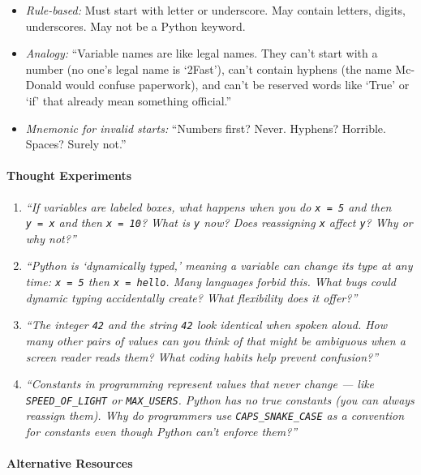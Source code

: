 \documentclass[
  justified,
  openright,
]{tufte-book}
\let\paragraph\paragraph
\let\paragraph\paragraph
\providecommand{\tightlist}{%
  \setlength{\itemsep}{0pt}\setlength{\parskip}{0pt}}
\begin{document}
\begin{itemize}
\tightlist
\item
  \emph{Rule-based:} Must start with letter or underscore. May contain
  letters, digits, underscores. May not be a Python keyword.
\item
  \emph{Analogy:} ``Variable names are like legal names. They can't
  start with a number (no one's legal name is `2Fast'), can't contain
  hyphens (the name Mc-Donald would confuse paperwork), and can't be
  reserved words like `True' or `if' that already mean something
  official.''
\item
  \emph{Mnemonic for invalid starts:} ``Numbers first? Never. Hyphens?
  Horrible. Spaces? Surely not.''
\end{itemize}

\paragraph{Thought Experiments}\label{thought-experiments-6}

\begin{enumerate}
\def\labelenumi{\arabic{enumi}.}
\item
  \emph{``If variables are labeled boxes, what happens when you do
  \texttt{x\ =\ 5} and then \texttt{y\ =\ x} and then \texttt{x\ =\ 10}?
  What is \texttt{y} now? Does reassigning \texttt{x} affect \texttt{y}?
  Why or why not?''}
\item
  \emph{``Python is `dynamically typed,' meaning a variable can change
  its type at any time: \texttt{x\ =\ 5} then
  \texttt{x\ =\ \textquotesingle{}hello\textquotesingle{}}. Many
  languages forbid this. What bugs could dynamic typing accidentally
  create? What flexibility does it offer?''}
\item
  \emph{``The integer \texttt{42} and the string
  \texttt{\textquotesingle{}42\textquotesingle{}} look identical when
  spoken aloud. How many other pairs of values can you think of that
  might be ambiguous when a screen reader reads them? What coding habits
  help prevent confusion?''}
\item
  \emph{``Constants in programming represent values that never change
  --- like \texttt{SPEED\_OF\_LIGHT} or \texttt{MAX\_USERS}. Python has
  no true constants (you can always reassign them). Why do programmers
  use \texttt{CAPS\_SNAKE\_CASE} as a convention for constants even
  though Python can't enforce them?''}
\end{enumerate}

\paragraph{Alternative Resources}\label{alternative-resources}
\end{document}
